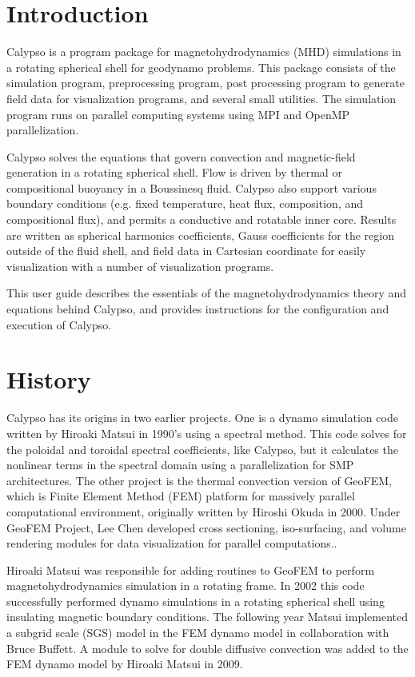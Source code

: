 \section{Introduction}
\label{section:introduction}
Calypso is a program package for magnetohydrodynamics (MHD) simulations in a rotating spherical shell for geodynamo problems. This package consists of the simulation program, preprocessing program, post processing program to generate field data for visualization programs, and several small utilities. The simulation program runs on parallel computing systems using MPI and OpenMP parallelization.

Calypso solves the equations that govern convection and magnetic-field generation in a rotating spherical shell. Flow is driven by thermal or compositional buoyancy in a Boussinesq fluid. Calypso also support various boundary conditions (e.g. fixed temperature, heat flux, composition, and compositional flux), and permits a conductive and rotatable inner core. Results are written as spherical harmonics coefficients, Gauss coefficients for the region outside of the fluid shell, and field data in Cartesian coordinate for easily visualization with a number of visualization programs.

This user guide describes the essentials of the magnetohydrodynamics theory and equations behind Calypso, and provides instructions for the configuration and execution of Calypso.

\section{History}
\label{sec:history}
Calypso has its origins in two earlier projects. One is a dynamo simulation code written by Hiroaki Matsui in 1990's using a spectral method. This code solves for the poloidal and toroidal spectral coefficients, like Calypso, but it calculates the nonlinear terms in the spectral domain using a parallelization for SMP architectures. The other project is the thermal convection version of GeoFEM, which is Finite Element Method (FEM) platform for massively parallel computational environment, originally written by Hiroshi Okuda in 2000. Under GeoFEM Project, Lee Chen developed cross sectioning, iso-surfacing, and volume rendering modules for data visualization for parallel computations.. 

Hiroaki Matsui was responsible for adding routines to GeoFEM to perform magnetohydrodynamics simulation in a rotating frame. In 2002 this code successfully performed dynamo simulations in a rotating spherical shell using insulating magnetic boundary conditions.  The following year Matsui implemented a subgrid scale (SGS) model in the FEM dynamo model in collaboration with Bruce Buffett. A module to solve for double diffusive convection was added to the FEM dynamo model by Hiroaki Matsui in 2009.


